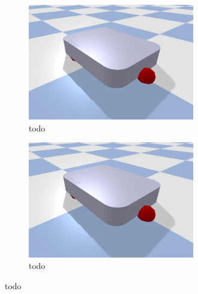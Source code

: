 \begin{figure}[H]
    \centering
    \begin{subfigure}{.5\textwidth}
    \centering
    \includegraphics[width=0.8\textwidth]{figures/boxer_robot.png}
    \caption{todo}%
    \label{subfig:todo}
    \end{subfigure}%

    \begin{subfigure}{.5\textwidth}
    \centering
    \includegraphics[width=0.8\textwidth]{figures/boxer_robot.png}
    \caption{todo}%
    \label{subfig:B}
    \end{subfigure}
    \caption{todo}%
    \label{subfig:blocked_path_hgraph_exmple}
\end{figure}



